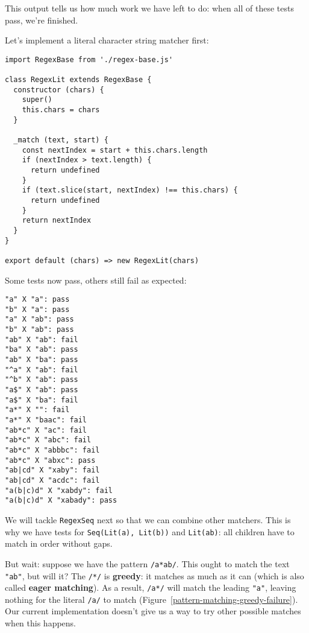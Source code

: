\documentclass[krantzl]{krantz}
\newcommand{\figref}[1]{Figure~\ref{#1}}
\newcommand{\glossref}[1]{\textbf{#1}}
\begin{document}
\noindent This output tells us how much work we have left to do:
when all of these tests pass,
we’re finished.


Let’s implement a literal character string matcher first:


\begin{lstlisting}[frame=tblr]
import RegexBase from './regex-base.js'

class RegexLit extends RegexBase {
  constructor (chars) {
    super()
    this.chars = chars
  }

  _match (text, start) {
    const nextIndex = start + this.chars.length
    if (nextIndex > text.length) {
      return undefined
    }
    if (text.slice(start, nextIndex) !== this.chars) {
      return undefined
    }
    return nextIndex
  }
}

export default (chars) => new RegexLit(chars)
\end{lstlisting}



Some tests now pass, others still fail as expected:


\begin{lstlisting}[frame=tblr,backgroundcolor=\color{black!5}]
"a" X "a": pass
"b" X "a": pass
"a" X "ab": pass
"b" X "ab": pass
"ab" X "ab": fail
"ba" X "ab": pass
"ab" X "ba": pass
"^a" X "ab": fail
"^b" X "ab": pass
"a$" X "ab": pass
"a$" X "ba": fail
"a*" X "": fail
"a*" X "baac": fail
"ab*c" X "ac": fail
"ab*c" X "abc": fail
"ab*c" X "abbbc": fail
"ab*c" X "abxc": pass
"ab|cd" X "xaby": fail
"ab|cd" X "acdc": fail
"a(b|c)d" X "xabdy": fail
"a(b|c)d" X "xabady": pass
\end{lstlisting}



We will tackle \texttt{RegexSeq} next so that we can combine other matchers.
This is why we have tests for \texttt{Seq(Lit({\textquotesingle}a{\textquotesingle}), Lit({\textquotesingle}b{\textquotesingle}))} and \texttt{Lit({\textquotesingle}ab{\textquotesingle})}:
all children have to match in order without gaps.


But wait:
suppose we have the pattern \texttt{/a*ab/}.
This ought to match the text \texttt{"ab"}, but will it?
The \texttt{/*/} is \glossref{greedy}: it matches as much as it can
(which is also called \glossref{eager matching}).
As a result,
\texttt{/a*/} will match the leading \texttt{"a"}, leaving nothing for the literal \texttt{/a/} to match
(\figref{pattern-matching-greedy-failure}).
Our current implementation doesn’t give us a way to try other possible matches when this happens.
\end{document}
